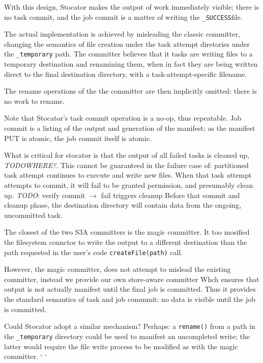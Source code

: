 \documentclass[conference]{IEEEtran}
\newcommand{\SUCCESS}{\texttt{\_SUCCESS}}
\newcommand{\TODO}{\emph{TODO}}
\begin{document}
With this design, Stocator makes the output of work immediately visible;
there is no task commit, and the job commit is a matter of writing
the \SUCCESS file.

The actual implementation is achieved by misleading the classic committer,
changing the semantics of file creation under the task attempt diretories
under the \texttt{\_temporary} path.
The committer believes that it tasks are
 writing files to a temporary destination and renamining them, when
in fact they are being written direct to the final destination directory,
with a task-attempt-specific filename.

The rename operations of the the committer are then implicitly omitted:
there is no work to rename.

Note that Stocator's task commit operation is a no-op, thus repeatable.
Job commit is a listing of the output and generation of the manifest;
as the manifest PUT is atomic, the job commit itself is atomic.

What is critical for stocator is that the output of all failed tasks
is cleaned up, \TODO \emph{WHERE?}.
This cannot be guaranteed in the failure case of: partitioned task attempt
continues to execute and write new files.
When that task attempt attempts to commit, it will fail to be granted permission,
and presumably clean up.
\TODO: verify commit $\rightarrow$ fail triggers cleanup
Before that commit and cleanup phase, the destination directory will contain
data from the ongoing, uncommitted task.

The closest of the two S3A committers is the magic committer.
It too mosified the filesystem connctor to write the output to a
different destination than the path requested
in the user's code \texttt{createFile(path)} call.

However, the magic committer, does not attempt to mislead the existing committer,
instead we provide our own store-aware committer
Whch ensures that output is not actually manifest until
the final job is committed.
Thus it provides the standard semantics of task and job commmit: no data is
visible until the job is committed.

Could Stocator adopt a similar mechanism?
Perhaps: a \texttt{rename()} from a path in the \texttt{_temporary} directory
could be used to manifest an uncompleted write;
the latter would require the file write process to be modified as with
the magic committer.
`%
`
\end{document}
